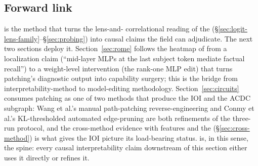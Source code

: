 \subsection{Forward link}
\label{sec:patching-forward}

 is the method that turns the lens-and-
correlational reading of the 
(\S\ref{sec:logit-lens-family}--\S\ref{sec:probing}) into causal claims
the field can adjudicate. The next two sections deploy it.
Section~\ref{sec:rome} follows the heatmap of
\citet[Fig.~1]{meng2022-rome} from a localization claim
(``mid-layer MLPs at the last subject token mediate factual recall'')
to a weight-level intervention (the rank-one MLP edit) that turns
patching's diagnostic output into capability surgery; this is the
bridge from interpretability-method to model-editing
methodology. Section~\ref{sec:circuits} consumes patching as one of two
methods that produce the IOI  and the ACDC subgraph: Wang et
al.'s manual path-patching reverse-engineering and Conmy et al.'s
KL-thresholded automated edge-pruning are both refinements of the
three-run protocol, and the cross-method evidence with  features
and the  (\S\ref{sec:cross-method}) is what gives the IOI
picture its load-bearing status.  is, in this
sense, the spine: every causal interpretability claim downstream of
this section either uses it directly or refines it.

